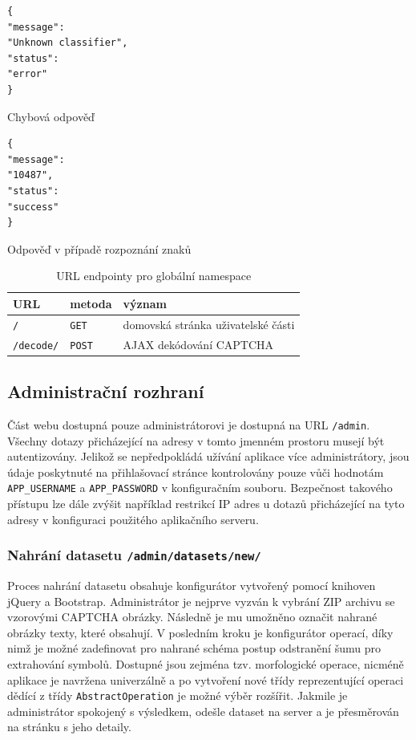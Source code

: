 \documentclass[
  field=ainfp,
  master=true,
  biblatex,
  sourcecodes=false,
  theorems=false,
  glossaries,
  index
]{kidiplom}
\begin{document}
\begin{minipage}{0.45\textwidth}
\begin{verbatim}
{
"message":
"Unknown classifier",
"status":
"error"
}
\end{verbatim}
Chybová odpověď
\end{minipage}
\hfill
\begin{minipage}{0.45\textwidth}
\begin{verbatim}
{
"message":
"10487",
"status":
"success"
}
\end{verbatim}
Odpověď v případě rozpoznání znaků
\end{minipage}

\begin{table}[H]
\centering
\begin{tabular}{|l|l|l|}
\hline
\textbf{URL} & \textbf{metoda} & \textbf{význam}
\\ \hline
\texttt{/} & \texttt{GET} & domovská stránka uživatelské části
\\ \hline
\texttt{/decode/} & \texttt{POST} & AJAX dekódování CAPTCHA
\\ \hline
\end{tabular}
\caption{URL endpointy pro globální namespace}
\end{table}

\subsection{Administrační rozhraní}
Část webu dostupná pouze administrátorovi je dostupná na URL \texttt{/admin}. Všechny dotazy přicházející na adresy v tomto jmenném prostoru musejí být autentizovány. Jelikož se nepředpokládá užívání aplikace více administrátory, jsou údaje poskytnuté na přihlašovací stránce kontrolovány pouze vůči hodnotám \texttt{APP\_USERNAME} a \texttt{APP\_PASSWORD} v konfiguračním souboru. Bezpečnost takového přístupu lze dále zvýšit například restrikcí IP adres u dotazů přicházející na tyto adresy v konfiguraci použitého aplikačního serveru.

\subsubsection*{Nahrání datasetu \texttt{/admin/datasets/new/}}
Proces nahrání datasetu obsahuje konfigurátor vytvořený pomocí knihoven jQuery a  Bootstrap. Administrátor je nejprve vyzván k vybrání ZIP archivu se vzorovými CAPTCHA obrázky. Následně je mu umožněno označit nahrané obrázky texty, které obsahují. V posledním kroku je konfigurátor operací, díky nimž je možné zadefinovat pro nahrané schéma postup odstranění šumu pro extrahování symbolů. Dostupné jsou zejména tzv. morfologické operace, nicméně aplikace je navržena univerzálně a po vytvoření nové třídy reprezentující operaci dědící z třídy \texttt{AbstractOperation} je možné výběr rozšířit. Jakmile je administrátor spokojený s výsledkem, odešle dataset na server a je přesměrován na stránku s jeho detaily.
\end{document}

